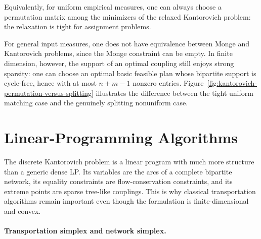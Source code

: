 Equivalently, for uniform empirical measures, one can always choose a permutation matrix among the minimizers of the relaxed Kantorovich problem: the relaxation is tight for assignment problems.

\begin{rem}
	For general input measures, one does not have equivalence between Monge and Kantorovich problems, since the Monge constraint can be empty. In finite dimension, however, the support of an optimal coupling still enjoys strong sparsity: one can choose an optimal basic feasible plan whose bipartite support is cycle-free, hence with at most $n+m-1$ nonzero entries. Figure~\ref{fig:kantorovich-permutation-versus-splitting} illustrates the difference between the tight uniform matching case and the genuinely splitting nonuniform case.
\end{rem}

\section{Linear-Programming Algorithms}
\label{sec-kantorovich-lp-algorithms}

The discrete Kantorovich problem is a linear program with much more structure than a generic dense LP. Its variables are the arcs of a complete bipartite network, its equality constraints are flow-conservation constraints, and its extreme points are sparse tree-like couplings. This is why classical transportation algorithms remain important even though the formulation is finite-dimensional and convex.

\paragraph{Transportation simplex and network simplex.}

